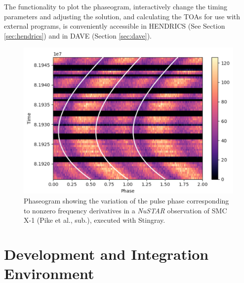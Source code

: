 \documentclass[twocolumn]{aastex62}
\newcommand{\project}[1]{\textsl{#1}\xspace}
\newcommand{\nustar}{\project{NuSTAR}\xspace}
\begin{document}
The functionality to plot the phaseogram, interactively change the timing parameters and adjusting the solution, and calculating the TOAs for use with external programs, is conveniently accessible in HENDRICS (See Section \ref{sec:hendrics}) and in DAVE (Section \ref{sec:dave}).

\begin{figure}[htbp]
\begin{center}
\includegraphics[width=\linewidth]{../figures/phaseogram.pdf}
\caption{Phaseogram showing the variation of the pulse phase corresponding to nonzero frequency derivatives in a \nustar observation of SMC X-1 (Pike et al., sub.), executed with Stingray.}
\label{fig:phaseogram}
\end{center}
\end{figure}




\section{Development and Integration Environment}
\label{sec:development}
\end{document}
